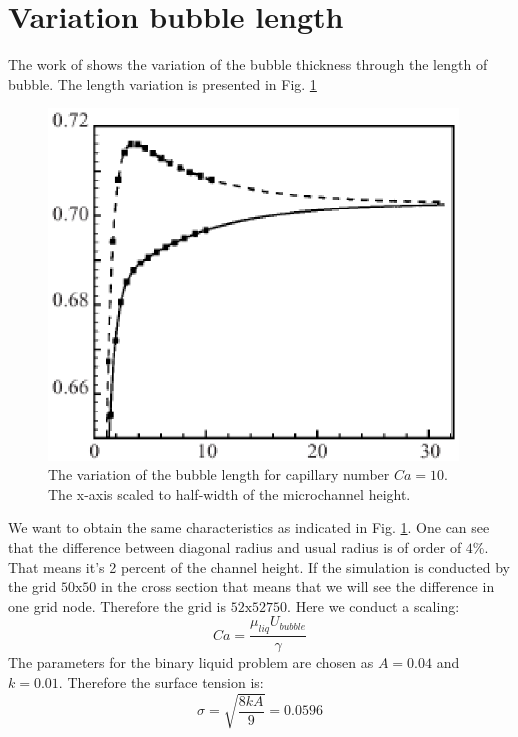 \documentclass{article}
\begin{document}
\section{Variation bubble length}
The work of \cite{heil-threedim} shows the variation of the bubble thickness through the length of
bubble. The length variation is presented in Fig. \ref{fig:thickness:variation:ca:ten}
\begin{figure}
\includegraphics[width=0.97\textwidth]{Figures/variationoverlength.eps}
\caption{The variation of the bubble length for capillary number $Ca=10$. The x-axis scaled to
half-width of the microchannel height.  \label{fig:thickness:variation:ca:ten}}
\end{figure}
We want to obtain the same characteristics as indicated in Fig.
\ref{fig:thickness:variation:ca:ten}. One can see that the difference between diagonal radius and
usual radius is of order of $4\%$. That means it's 2 percent of the channel height. If the
simulation is conducted by the grid $50\mathrm{x}50$ in the cross section that means that we will
see the difference in one grid node. Therefore the grid is $52\mathrm{x}52\mathrm{750}$. Here we
conduct a scaling:
\begin{equation}
Ca=\frac{\mu_{liq} U_{bubble}}{\gamma}
\end{equation}
The parameters for the binary liquid problem are chosen as $A=0.04$ and $k=0.01$. Therefore the
surface tension is:
\begin{equation}
\sigma = \sqrt{\frac{8 k A}{9}}=0.0596
\end{equation}
\end{document}
